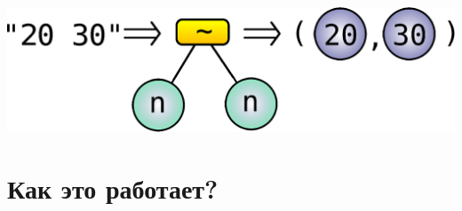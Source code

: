 \documentclass{beamer}
\begin{document}
\begin{frame}
  \includegraphics[scale=0.50]{images/combined-parsers-example.eps}
\end{frame}

\section{Как это работает?}
\end{document}
